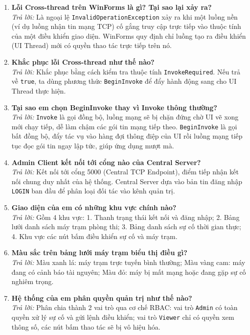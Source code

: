 \documentclass[12pt,a4paper]{article}
\begin{document}
\begin{enumerate}[leftmargin=*, label=\textbf{Câu \arabic*:}]
  \item \textbf{Lỗi Cross-thread trên WinForms là gì? Tại sao lại xảy ra?} \\
    \textit{Trả lời:} Là ngoại lệ \texttt{InvalidOperationException} xảy ra khi một luồng nền (ví dụ luồng nhận tin mạng TCP) cố gắng truy cập trực tiếp vào thuộc tính của một điều khiển giao diện. WinForms quy định chỉ luồng tạo ra điều khiển (UI Thread) mới có quyền thao tác trực tiếp trên nó.
  \item \textbf{Khắc phục lỗi Cross-thread như thế nào?} \\
    \textit{Trả lời:} Khắc phục bằng cách kiểm tra thuộc tính \texttt{InvokeRequired}. Nếu trả về \texttt{true}, ta dùng phương thức \texttt{BeginInvoke} để đẩy hành động sang cho UI Thread thực hiện.
  \item \textbf{Tại sao em chọn BeginInvoke thay vì Invoke thông thường?} \\
    \textit{Trả lời:} \texttt{Invoke} là gọi đồng bộ, luồng mạng sẽ bị chặn đứng chờ UI vẽ xong mới chạy tiếp, dễ làm chậm các gói tin mạng tiếp theo. \texttt{BeginInvoke} là gọi bất đồng bộ, đẩy tác vụ vào hàng đợi thông điệp của UI rồi luồng mạng tiếp tục đọc gói tin ngay lập tức, giúp ứng dụng mượt mà.
  \item \textbf{Admin Client kết nối tới cổng nào của Central Server?} \\
    \textit{Trả lời:} Kết nối tới cổng 5000 (Central TCP Endpoint), điểm tiếp nhận kết nối chung duy nhất của hệ thống. Central Server dựa vào bản tin đăng nhập \texttt{LOGIN} ban đầu để phân loại đối tác vào kênh quản trị.
  \item \textbf{Giao diện của em có những khu vực chính nào?} \\
    \textit{Trả lời:} Gồm 4 khu vực: 1. Thanh trạng thái kết nối và đăng nhập; 2. Bảng lưới danh sách máy trạm phòng thi; 3. Bảng danh sách sự cố thời gian thực; 4. Khu vực các nút bấm điều khiển sự cố và máy trạm.
  \item \textbf{Màu sắc trên bảng lưới máy trạm biểu thị điều gì?} \\
    \textit{Trả lời:} Màu xanh lá: máy trạm trực tuyến bình thường; Màu vàng cam: máy đang có cảnh báo tài nguyên; Màu đỏ: máy bị mất mạng hoặc đang gặp sự cố nghiêm trọng.
  \item \textbf{Hệ thống của em phân quyền quản trị như thế nào?} \\
    \textit{Trả lời:} Phân chia thành 2 vai trò qua cơ chế RBAC: vai trò \texttt{Admin} có toàn quyền xử lý sự cố và gửi lệnh điều khiển; vai trò \texttt{Viewer} chỉ có quyền xem thông số, các nút bấm thao tác sẽ bị vô hiệu hóa.

\end{enumerate}
\end{document}
